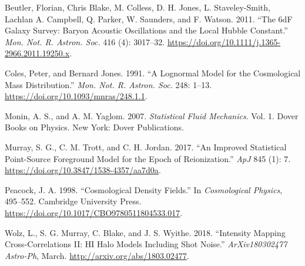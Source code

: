 \documentclass[10pt,a4paper,onecolumn]{article}
\begin{document}
\hypertarget{refs}{}
\leavevmode\hypertarget{ref-Beutler2011}{}%
Beutler, Florian, Chris Blake, M. Colless, D. H. Jones, L.
Staveley-Smith, Lachlan A. Campbell, Q. Parker, W. Saunders, and F.
Watson. 2011. ``The 6dF Galaxy Survey: Baryon Acoustic Oscillations and
the Local Hubble Constant.'' \emph{Mon. Not. R. Astron. Soc.} 416 (4):
3017--32. \url{https://doi.org/10.1111/j.1365-2966.2011.19250.x}.

\leavevmode\hypertarget{ref-Coles1991}{}%
Coles, Peter, and Bernard Jones. 1991. ``A Lognormal Model for the
Cosmological Mass Distribution.'' \emph{Mon. Not. R. Astron. Soc.} 248:
1--13. \url{https://doi.org/10.1093/mnras/248.1.1}.

\leavevmode\hypertarget{ref-Monin2007}{}%
Monin, A. S., and A. M. Yaglom. 2007. \emph{Statistical Fluid
Mechanics}. Vol. 1. Dover Books on Physics. New York: Dover
Publications.

\leavevmode\hypertarget{ref-Murray2017}{}%
Murray, S. G., C. M. Trott, and C. H. Jordan. 2017. ``An Improved
Statistical Point-Source Foreground Model for the Epoch of
Reionization.'' \emph{ApJ} 845 (1): 7.
\url{https://doi.org/10.3847/1538-4357/aa7d0a}.

\leavevmode\hypertarget{ref-Peacock1999}{}%
Peacock, J. A. 1998. ``Cosmological Density Fields.'' In
\emph{Cosmological Physics}, 495--552. Cambridge University Press.
\url{https://doi.org/10.1017/CBO9780511804533.017}.

\leavevmode\hypertarget{ref-Wolz2018}{}%
Wolz, L., S. G. Murray, C. Blake, and J. S. Wyithe. 2018. ``Intensity
Mapping Cross-Correlations II: HI Halo Models Including Shot Noise.''
\emph{ArXiv180302477 Astro-Ph}, March.
\url{http://arxiv.org/abs/1803.02477}.
\end{document}
